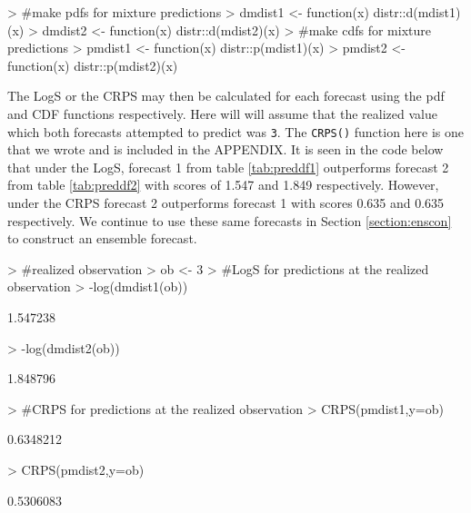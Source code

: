 \documentclass[11pt,notitlepage]{isuthesis}
\begin{document}
\begin{Schunk}
\begin{Sinput}
> #make pdfs for mixture predictions
> dmdist1 <- function(x) {distr::d(mdist1)(x)}
> dmdist2 <- function(x) {distr::d(mdist2)(x)}
> #make cdfs for mixture predictions
> pmdist1 <- function(x) {distr::p(mdist1)(x)}
> pmdist2 <- function(x) {distr::p(mdist2)(x)}
\end{Sinput}
\end{Schunk}




The LogS or the CRPS may then be calculated for each forecast using the pdf
and CDF functions respectively. Here will will assume that the realized value
which both forecasts attempted to predict was \texttt{3}. 
The \texttt{CRPS()} function
here is one that we wrote and is
included in the APPENDIX. It is seen in the code below that under the
LogS, forecast 1 from table \ref{tab:preddf1} outperforms forecast 2 from table
\ref{tab:preddf2} with scores of 1.547 and 
1.849 respectively. 
However, under the CRPS forecast 2 outperforms forecast 1
with scores 0.635 and 
0.635 respectively. We continue to use these same
forecasts in Section \ref{section:enscon} to construct an ensemble forecast.

\begin{Schunk}
\begin{Sinput}
> #realized observation
> ob <- 3
> #LogS for predictions at the realized observation
> -log(dmdist1(ob))
\end{Sinput}
\begin{Soutput}
[1] 1.547238
\end{Soutput}
\begin{Sinput}
> -log(dmdist2(ob))
\end{Sinput}
\begin{Soutput}
[1] 1.848796
\end{Soutput}
\end{Schunk}

\begin{Schunk}
\begin{Sinput}
> #CRPS for predictions at the realized observation
> CRPS(pmdist1,y=ob)
\end{Sinput}
\begin{Soutput}
[1] 0.6348212
\end{Soutput}
\begin{Sinput}
> CRPS(pmdist2,y=ob)
\end{Sinput}
\begin{Soutput}
[1] 0.5306083
\end{Soutput}
\end{Schunk}
\end{document}
